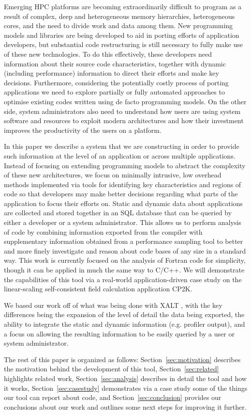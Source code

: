 Emerging HPC platforms are becoming extraordinarily difficult to program as a result of complex, deep and heterogeneous memory hierarchies, heterogeneous cores, and the need to divide work and data among them.
New programming models and libraries are being developed to aid in porting efforts of application developers, but substantial code restructuring is still necessary to fully make use of these new technologies.
To do this effectively, these developers need information about their source code characteristics, together with dynamic (including performance) information to direct their efforts and make key decisions.
Furthermore, considering the potentially costly process of porting applications we need to explore partially or fully automated approaches to optimise existing codes written using de facto programming models.
On the other side, system administrators also need to understand how users are using system software and resources to exploit modern architectures and how their investment improves the productivity of the users on a platform.

In this paper we describe a system that we are constructing in order to provide such information at the level of an application or across multiple applications.
Instead of focusing on extending programming models to abstract the complexity of these new architectures, we focus on minimally intrusive, low overhead methods implemented via tools for identifying key characteristics and regions of code so that developers may make better decisions regarding what parts of the application to focus their efforts on.
Static and dynamic data about applications are collected and stored together in an \acs{SQL} database that can be queried by either a developer or a system administrator.
This allows us to perform analysis of code by combining information exported from the compiler with supplementary information obtained from a performance sampling tool to better and more finely investigate  and reason about code bases of any size in a standard way.
This work is currently focused on the analysis of Fortran code for simplicity, though it can be applied in much the same way to C/C++.
We will demonstrate the capabilities of this tool via a real-world application-driven case study on the linear-scaling self-consistent field calculation application CP2K.

We based our work off of what was being done with XALT \cite{7081224}, with the key differences being the expansion of the level of detail the data being exported, the ability to integrate the static and dynamic information (e.g. profiler output), and a focus on allowing the resulting information to be easily queried by a user or system administrator.

The rest of this paper is organized as follows: Section~\ref{sec:motivation} describes the motivation behind the development of this tool, Section~\ref{sec:related} highlights related work, Section~\ref{sec:analysis} describes in detail the tool and how it works, Section~\ref{sec:casestudy} demonstrates via a case study some of the things our tool can report about code, and Section~\ref{sec:conclusion} provides our conclusions about our work and outlines some next steps for improving it further.
